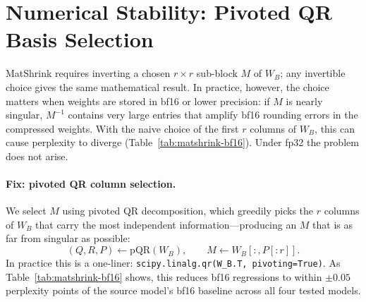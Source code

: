 \documentclass{article}
\newcommand{\eR}[2]{$\in \mathbb{R}^{#1 \times #2}$}  %
\begin{document}

\section{Numerical Stability: Pivoted QR Basis Selection} \label{sec:precision}
MatShrink requires inverting a chosen $r \times r$ sub-block $M$ of $W_B$; any invertible choice gives the same mathematical result. In practice, however, the choice matters when weights are stored in bf16 or lower precision: if $M$ is nearly singular, $M^{-1}$ contains very large entries that amplify bf16 rounding errors in the compressed weights. With the naive choice of the first $r$ columns of $W_B$, this can cause perplexity to diverge (Table~\ref{tab:matshrink-bf16}). Under fp32 the problem does not arise.

\paragraph{Fix: pivoted QR column selection.}\label{prop:pqr}
We select $M$ using pivoted QR decomposition, which greedily picks the $r$ columns of $W_B$ that carry the most independent information---producing an $M$ that is as far from singular as possible:
\[
  (Q, R, P) \gets \mathrm{pQR}(W_B), \qquad M \gets W_B[:, P[:r]].
\]
In practice this is a one-liner: \texttt{scipy.linalg.qr(W\_B.T, pivoting=True)}. As Table~\ref{tab:matshrink-bf16} shows, this reduces bf16 regressions to within $\pm 0.05$ perplexity points of the source model's bf16 baseline across all four tested models.
\end{document}
